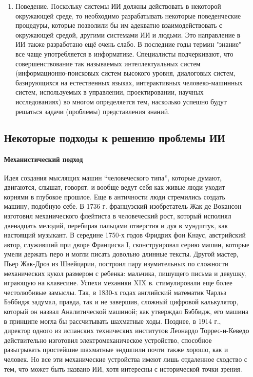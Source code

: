 \begin{enumerate}
\item{Поведение. Поскольку системы ИИ должны действовать в некоторой окружающей среде, то необходимо разрабатывать некоторые поведенческие процедуры, которые позволили бы им адекватно взаимодействовать с окружающей средой, другими системами ИИ и людьми. Это направление в ИИ также разработано ещё очень слабо. В последние годы термин "знание" все чаще употребляется в информатике. Специалисты подчеркивают, что совершенствование так называемых интеллектуальных систем (информационно-поисковых систем высокого уровня, диалоговых систем, базирующихся на естественных языках, интерактивных человеко-машинных систем, используемых в управлении, проектировании, научных исследованиях) во многом определяется тем, насколько успешно будут решаться задачи (проблемы) представления знаний.}
  
\end{enumerate}

\subsection{Некоторые подходы к решению проблемы ИИ}

\paragraph{Механистический подход}

Идея создания мыслящих машин ``человеческого типа'', которые думают, двигаются, слышат, говорят, и вообще ведут себя как живые люди уходит корнями в глубокое прошлое. Еще в античности люди стремились создать машину, подобную себе. В 1736 г. французский изобретатель Жак де Вокансон изготовил механического флейтиста в человеческий рост, который исполнял двенадцать мелодий, перебирая пальцами отверстия и дуя в мундштук, как настоящий музыкант. В середине 1750-х годов Фридрих фон Кнаус, австрийский автор, служивший при дворе Франциска I, сконструировал серию машин, которые умели держать перо и могли писать довольно длинные тексты. Другой мастер, Пьер Жак-Дроз из Швейцарии, построил пару изумительных по сложности механических кукол размером с ребенка: мальчика, пишущего письма и девушку, играющую на клавесине. Успехи механики XIX в. стимулировали еще более честолюбивые замыслы. Так, в 1830-х годах английский математик Чарльз Бэббидж задумал, правда, так и не завершив, сложный цифровой калькулятор, который он назвал Аналитической машиной; как утверждал Бэббидж, его машина в принципе могла бы рассчитывать шахматные ходы. Позднее, в 1914 г., директор одного из испанских технических институтов Леонардо Торрес-и-Кеведо действительно изготовил электромеханическое устройство, способное разыгрывать простейшие шахматные эндшпили почти также хорошо, как и человек. Но все эти механические устройства имеют лишь отдаленное сходство с тем, что может быть названо ИИ, хотя интересны с исторической точки зрения.

